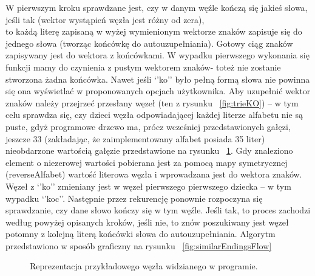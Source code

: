 \documentclass[twoside,a4paper]{book}
\begin{document}
W pierwszym kroku sprawdzane jest, czy w danym węźle kończą się  jakieś słowa, jeśli tak (wektor wystąpień węzła jest różny od zera), \\to każdą literę zapisaną w wyżej wymienionym wektorze znaków zapisuje się do jednego słowa (tworząc końcówkę do autouzupełniania). Gotowy ciąg znaków zapisywany jest do wektora z końcówkami. W wypadku pierwszego wykonania się funkcji mamy do czynienia z pustym wektorem znaków- toteż nie zostanie stwo\-rzo\-na żadna końcówka. Nawet jeśli  ‘’ko’’ było pełną formą słowa nie powinna się ona wyświetlać w proponowanych opcjach użytkownika. Aby uzupełnić we\-ktor znaków należy przejrzeć przesłany węzeł (ten z rysunku ~\ref{fig:trieKO}) – w tym celu sprawdza się, czy dzieci węzła odpowiadającej każdej literze alfabetu nie są puste, gdyż programowe drzewo ma, prócz wcześniej przedstawionych gałęzi, jeszcze 33 (zakładając, że zaimplementowany alfabet posiada 35 liter) nieobdarzone wartością gałęzie przedstawione na rysunku ~\ref{fig:trieKOnull}. Gdy znaleziono element o niezerowej wartości pobierana jest za pomocą mapy symetrycznej (reverseAlfabet) wartość literowa węzła i wprowadzana jest do wektora znaków. Węzeł z ‘’ko’’ zmieniany jest w węzeł pierwszego pierwszego dziecka – w tym wypadku ‘’koc’’. Następnie przez rekurencję ponownie rozpoczyna się sprawdzanie, czy dane słowo kończy się w tym węźle. Jeśli tak, to proces zachodzi według powyżej opisanych kroków, jeśli nie, to znów poszukiwany jest węzeł potomny z kolejną literą końcówki słowa do autouzupełniania. Algorytm przedstawiono w sposób graficzny na rysunku ~\ref{fig:similarEndingsFlow}
		\begin{figure}[!h]
		\centering
		\caption{Reprezentacja przykładowego węzła widzianego w programie. }
		\label{fig:trieKOnull}
		\end{figure}
\end{document}

